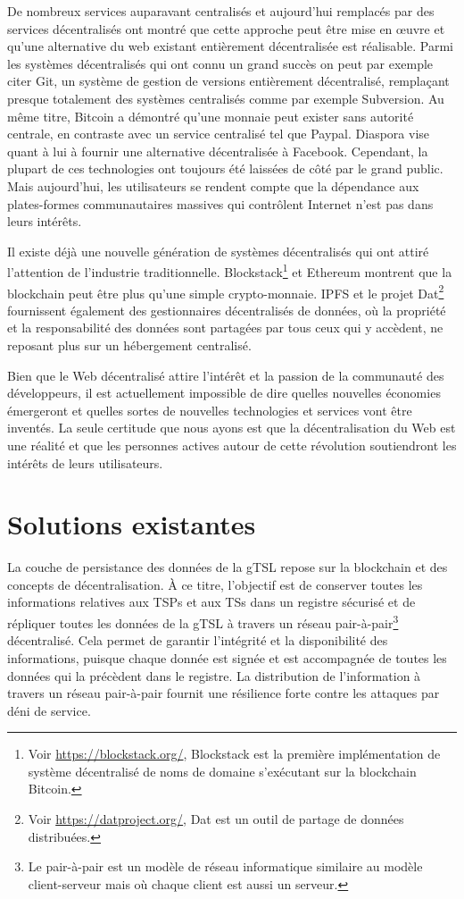 \documentclass{tnreport}
\begin{document}
De nombreux services auparavant centralisés et aujourd'hui remplacés par des services décentralisés ont montré que cette approche peut être mise en œuvre et qu'une alternative du web existant entièrement décentralisée est réalisable. 
Parmi les systèmes décentralisés qui ont connu un grand succès on peut par exemple citer Git, un système de gestion de versions entièrement décentralisé, remplaçant presque totalement des systèmes centralisés comme par exemple Subversion. 
Au même titre, Bitcoin a démontré qu'une monnaie peut exister sans autorité centrale, en contraste avec un service centralisé tel que Paypal. 
Diaspora vise quant à lui à fournir une alternative décentralisée à Facebook.
Cependant, la plupart de ces technologies ont toujours été laissées de côté par le grand public. Mais aujourd'hui, les utilisateurs se rendent compte que la dépendance aux plates-formes communautaires massives qui contrôlent Internet n'est pas dans leurs intérêts.

Il existe déjà une nouvelle génération de systèmes décentralisés qui ont attiré l'attention de l'industrie traditionnelle.
Blockstack\footnote{Voir \url{https://blockstack.org/}, Blockstack est la première implémentation de système décentralisé de noms de domaine s'exécutant sur la blockchain Bitcoin.} et Ethereum montrent que la blockchain peut être plus qu'une simple crypto-monnaie. IPFS et le projet Dat\footnote{Voir \url{https://datproject.org/}, Dat est un outil de partage de données distribuées.} fournissent également des gestionnaires décentralisés de données, où la propriété et la responsabilité des données sont partagées par tous ceux qui y accèdent, ne reposant plus sur un hébergement centralisé.

Bien que le Web décentralisé attire l'intérêt et la passion de la communauté des développeurs, il est actuellement impossible de dire quelles nouvelles économies émergeront et quelles sortes de nouvelles technologies et services vont être inventés. La seule certitude que nous ayons est que la décentralisation du Web est une réalité et que les personnes actives autour de cette révolution soutiendront les intérêts de leurs utilisateurs.

\section{Solutions existantes}
\label{sec:solutions}

La couche de persistance des données de la gTSL repose sur la blockchain et des concepts de décentralisation. À ce titre, l'objectif est de conserver toutes les informations relatives aux TSPs et aux TSs dans un registre sécurisé et de répliquer toutes les données de la gTSL à travers un réseau pair-à-pair\footnote{Le pair-à-pair est un modèle de réseau informatique similaire au modèle client-serveur mais où chaque client est aussi un serveur.} décentralisé.
Cela permet de garantir l'intégrité et la disponibilité des informations, puisque chaque donnée est signée et est accompagnée de toutes les données qui la précèdent dans le registre. La distribution de l'information à travers un réseau pair-à-pair fournit une résilience forte contre les attaques par déni de service.
\end{document}

